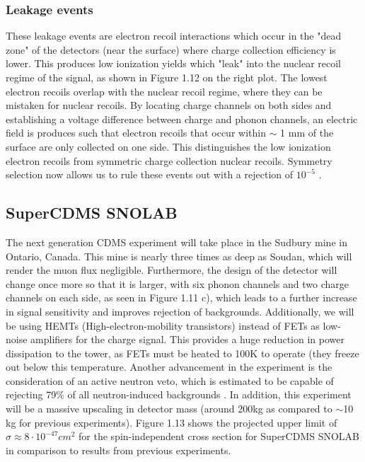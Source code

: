 \documentclass{report}
\begin{document}
\subsubsection{Leakage events}

These leakage events are electron recoil interactions which occur in the "dead zone" of the detectors (near the surface) where charge collection efficiency is lower. This produces low ionization yields which "leak" into the nuclear recoil regime of the signal, as shown in Figure 1.12 on the right plot. The lowest electron recoils overlap with the nuclear recoil regime, where they can be mistaken for nuclear recoils. By locating charge channels on both sides and establishing a voltage difference between charge and phonon channels, an electric field is produces such that electron recoils that occur within $\sim$ 1 mm of the surface are only collected on one side. This distinguishes the low ionization electron recoils from symmetric charge collection nuclear recoils. Symmetry selection now allows us to rule these events out with a rejection of $10^{-5}$ \cite{Saab2012}.

\subsection{SuperCDMS SNOLAB}

The next generation CDMS experiment will take place in the Sudbury mine in Ontario, Canada. This mine is nearly three times as deep as Soudan, which will render the muon flux negligible. Furthermore, the design of the detector will change once more so that it is larger, with six phonon channels and two charge channels on each side, as seen in Figure 1.11 c), which leads to a further increase in signal sensitivity and improves rejection of backgrounds. Additionally, we will be using HEMTs (High-electron-mobility transistors) instead of FETs as low-noise amplifiers for the charge signal. This provides a huge reduction in power dissipation to the tower, as FETs must be heated to 100K to operate (they freeze out below this temperature. Another advancement in the experiment is the consideration of an active neutron veto, which is estimated to be capable of rejecting 79\% of all neutron-induced backgrounds \cite{DOE}. In addition, this experiment will be a massive upscaling in detector mass (around 200kg as compared to $\sim$10 kg for previous experiments). Figure 1.13 shows the projected upper limit of $\sigma \approx 8 \cdot 10^{-47} cm^2$ for the spin-independent cross section for SuperCDMS SNOLAB in comparison to results from previous experiments.
\end{document}
